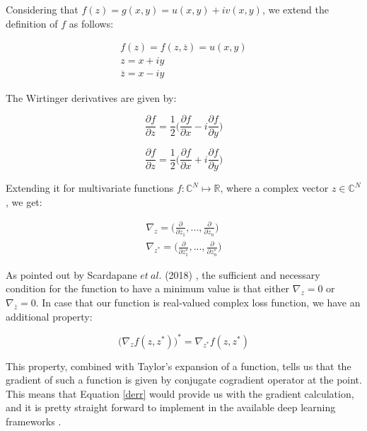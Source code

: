 Considering that $f(z) = g(x,y)=u(x,y)+iv(x,y)$, we extend the definition of $f$ as follows:

\begin{equation}
\begin{aligned}
f(z) = f(z,\overline{z}) = u(x,y)\\
z = x+iy\\
\overline{z} = x-iy
\end{aligned}
\end{equation}

The Wirtinger derivatives are given by:

\begin{equation}
\frac{\partial f}{\partial z} = \dfrac{1}{2}\bigg(\frac{\partial f}{\partial x}-i\frac{\partial f}{\partial y}\bigg)
\end{equation}


\begin{equation}
\label{derr}
\frac{\partial f}{\partial z} = \dfrac{1}{2}\bigg(\frac{\partial f}{\partial x}+i\frac{\partial f}{\partial y}\bigg)
\end{equation}

Extending it for multivariate functions $f:\mathbb{C}^{N} \mapsto \mathbb{R}$, where a complex vector $z \in \mathbb{C}^{N}$, we get:

\begin{equation}
\begin{aligned}
\nabla_{z} = \bigg( \frac{\partial}{\partial z_1},...,\frac{\partial}{\partial z_n}\bigg)\\
\nabla_{z^*} = \bigg( \frac{\partial}{\partial z_1^*},...,\frac{\partial}{\partial z_n^*}\bigg)
\end{aligned}
\end{equation}

As pointed out by Scardapane $et \ al.$ (2018) \cite{scardapane2018complex} , the sufficient and necessary condition for the function to have a minimum value is that either $\nabla_{z} = 0$ or $\nabla_{\overline{z}} = 0$. In case that our function is real-valued complex loss function, we have an additional property:


\begin{equation}
\bigg(\nabla_zf(z,z^{*})\bigg)^{*}= \nabla_{z^{*}}f(z,z^{*})
\end{equation}

This property, combined with Taylor's expansion of a function, tells us that the gradient of such a function is given by conjugate cogradient operator at the point. This means that Equation \ref{derr} would provide us with the gradient calculation, and it is pretty straight forward to implement in the available deep learning frameworks \cite{sarroff2015learning}.

